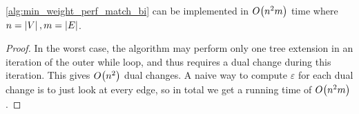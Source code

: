 \begin{theorem}
    \cref{alg:min_weight_perf_match_bi} can be implemented in $O_{} \! \left( n^2m \right)$ time where 
    $n = \left\lvert V \right\rvert, m = \left\lvert E \right\rvert$. 
    \label{thm:min_weight_perf_match_bi_runtime}
\end{theorem}
\begin{proof}
    In the worst case, the algorithm may perform only one tree extension in an iteration of the outer while loop, 
    and thus requires a dual change during this iteration. This gives $O_{} \! \left( n^2 \right)$ dual changes. 
    A naive way to compute $\varepsilon$ for each dual change is to just look at every edge, so in total we get 
    a running time of $O_{} \! \left( n^2m \right)$. 
\end{proof}
